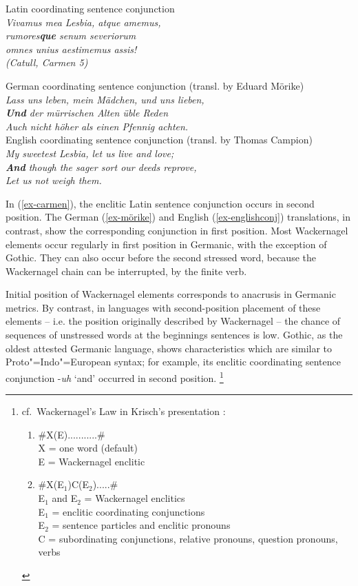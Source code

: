\documentclass[output=paper
  ,nobabel
  ,uniformtopskip %
]{langscibook}
\begin{document}
\eal\label{ex-wackernagelslaw}
\ex\label{ex-carmen}
 Latin coordinating sentence conjunction\\
\textit{Vivamus mea Lesbia, atque amemus,\\
 rumores\textbf{que} senum severiorum\\
omnes unius aestimemus assis!\\
\textup{(Catull,} Carmen 5)\\} 

\ex\label{ex-mörike}
German coordinating sentence conjunction (transl. by Eduard Mörike)\\
\textit{Lass uns leben, mein Mädchen, und uns lieben,\\
\textbf{Und} der mürrischen Alten üble Reden\\
 Auch nicht höher als einen Pfennig achten.\\}
\ex\label{ex-englishconj}
English coordinating sentence conjunction (transl. by Thomas Campion)\\
\textit{My sweetest Lesbia, let us live and love;\\
 \textbf{And} though the sager sort our deeds reprove,\\
 Let us not weigh them. \\}
\zl

\noindent
In (\ref{ex-carmen}), the enclitic Latin sentence conjunction occurs in second position. The German
(\ref{ex-mörike}) and English (\ref{ex-englishconj}) translations, in contrast, show the
corresponding conjunction in first position. Most Wackernagel elements occur regularly in first
position in Germanic, with the exception of Gothic. They can also occur before the second stressed
word, because the Wackernagel chain can be interrupted, \eg by the finite verb. 

Initial position of Wackernagel elements corresponds to anacrusis in Germanic metrics. By contrast, in languages with second-position placement of these elements – i.e. the position originally described by Wackernagel – the chance of sequences of unstressed words at the beginnings sentences is low. Gothic, as the oldest attested Germanic language, shows characteristics which are similar to Proto"=Indo"=European syntax; for example, its enclitic coordinating sentence conjunction -\textit{uh} `and' occurred in second position.%
%
\footnote{cf.\ Wackernagel's Law in Krisch's presentation \citep[283--284]{Krisch1997}:
\begin{enumerate}
	\item \#X(E)...........\#  \\ X = one word (default)\\ 
	E = Wackernagel enclitic  
\item \#X(E$_1$)C(E$_2$).....\#  \\ 
      E$_1$ and E$_2$ = Wackernagel enclitics \\ 
      E$_1$ = enclitic coordinating conjunctions \\       
      E$_2$ = sentence particles and enclitic pronouns \\ 
      C = subordinating conjunctions, relative pronouns, question pronouns, verbs
\end{enumerate} 
}
\end{document}
